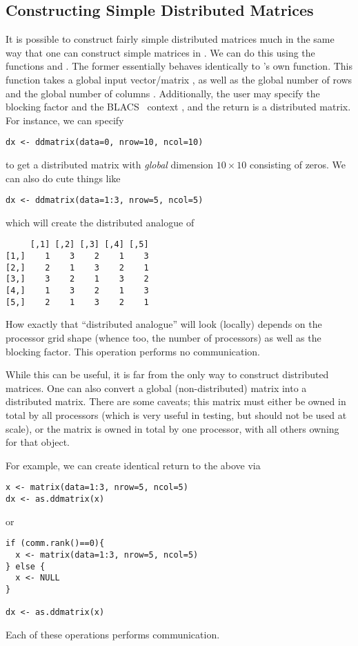 \subsection{Constructing Simple Distributed Matrices}

It is possible to construct fairly simple distributed matrices much in the same 
way that one can construct simple matrices in .  We can do this 
using the functions
 and
.
The former essentially behaves identically to 's own  
function.  This function takes a global input vector/matrix , as 
well as the global number of rows  and the global number of columns 
.  Additionally, the user may specify the blocking factor 
 and the BLACS~ context , and the 
return is a distributed matrix.  For instance, we can specify
\begin{lstlisting}[language=rr,title=ddmatrix()]
dx <- ddmatrix(data=0, nrow=10, ncol=10)
\end{lstlisting}
to get a distributed matrix with \emph{global} dimension $10\times 10$ 
consisting of zeros.  We can also do cute things like
\begin{lstlisting}[language=rr,title=ddmatrix()]
dx <- ddmatrix(data=1:3, nrow=5, ncol=5)
\end{lstlisting}
which will create the distributed analogue of
\begin{verbatim}
     [,1] [,2] [,3] [,4] [,5]
[1,]    1    3    2    1    3
[2,]    2    1    3    2    1
[3,]    3    2    1    3    2
[4,]    1    3    2    1    3
[5,]    2    1    3    2    1
\end{verbatim}
How exactly that ``distributed analogue'' will look (locally) depends on the 
processor grid shape (whence too, the number of processors) as well as the 
blocking factor.  This operation performs no communication.

While this can be useful, it is far from the only way to construct distributed 
matrices.  One can also convert a global (non-distributed) matrix into a 
distributed matrix.  There are some caveats; this matrix must either be owned in 
total by all processors (which is very useful in testing, but should not be used 
at scale), or the matrix is owned in total by one processor, with all others 
owning  for that object.  

For example, we can create identical return to the above via
\begin{lstlisting}[language=rr,title=as.ddmatrix()]
x <- matrix(data=1:3, nrow=5, ncol=5)
dx <- as.ddmatrix(x)
\end{lstlisting}
or
\begin{lstlisting}[language=rr,title=as.ddmatrix()]
if (comm.rank()==0){
  x <- matrix(data=1:3, nrow=5, ncol=5)
} else {
  x <- NULL
}

dx <- as.ddmatrix(x)
\end{lstlisting}
Each of these operations performs communication.

